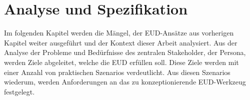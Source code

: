 \chapter{Analyse und Spezifikation}\label{chapter:analyse}
Im folgenden Kapitel werden die Mängel, der \ac{EUD}-Ansätze aus vorherigen Kapitel weiter ausgeführt und der Kontext dieser Arbeit analysiert. Aus der Analyse der Probleme und Bedürfnisse des zentralen Stakeholder, der Persona, werden Ziele abgeleitet, welche die \ac{EUD} erfüllen soll. Diese Ziele werden mit einer Anzahl von praktischen Szenarios verdeutlicht. Aus diesen Szenarios wiederum, werden Anforderungen an das zu konzeptionierende \ac{EUD}-Werkzeug festgelegt.  






